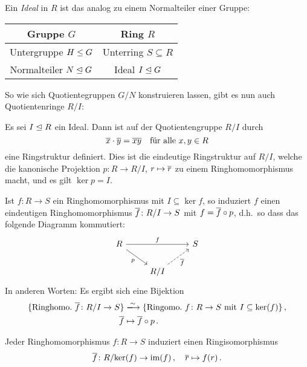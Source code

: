 Ein \emph{Ideal} in $R$ ist das analog zu einem Normalteiler einer Gruppe:
\begin{center}
  \begin{tabular}{|c|c|}
    \hline
      Gruppe $G$
    & Ring $R$
    \\
    \hline
      Untergruppe $H \mathrel{\leq} G$
    & Unterring $S \subseteq R$
    \\
    \hline
      Normalteiler $N \mathrel{\trianglelefteq} G$
    & Ideal $I \mathrel{\trianglelefteq} G$
    \\
    \hline
  \end{tabular}
\end{center}
So wie sich Quotientegruppen $G/N$ konstruieren lassen, gibt es nun auch Quotientenringe $R/I$:

Es sei $I \mathrel{\trianglelefteq} R$ ein Ideal.
Dann ist auf der Quotientengruppe $R/I$ durch
\[
    \overline{x} \cdot \overline{y}
  = \overline{xy}
  \quad
  \text{für alle $x, y \in R$}
\]
eine Ringstruktur definiert.
Dies ist die eindeutige Ringstruktur auf $R/I$, welche die kanonische Projektion $p \colon R \to R/I$, $r \mapsto \overline{r}$ zu einem Ringhomomorphismus macht, und es gilt $\ker p = I$.

\begin{theorem}
  Ist $f \colon R \to S$ ein Ringhomomorphismus mit $I \subseteq \ker f$, so induziert $f$ einen eindeutigen Ringhomomorphismus $\overline{f} \colon R/I \to S$ mit $f = \overline{f} \circ p$, d.h.\ so dass das folgende Diagramm kommutiert:
  \[
    \begin{tikzcd}
        R
        \arrow{rr}[above]{f}
        \arrow{dr}[below left]{p}
      & {}
      & S
      \\
        {}
      & R/I
        \arrow[dashed]{ru}[below right]{\induced{f}}
      & {}
    \end{tikzcd}
  \]
  In anderen Worten:
  Es ergibt sich eine Bijektion
  \begin{align*}
                            \{ \text{Ringhomo.\ $\induced{f} \colon R/I \to S$} \}
    &\xlongrightarrow{\sim} \{ \text{Ringomo.\ $f \colon R \to S$ mit $I \subseteq \ker(f)$} \} \,,  \\
                            \induced{f}
    &\mapsto                \induced{f} \circ p \,.
  \end{align*}
\end{theorem}

\begin{corollary}[1.\ Isomorphiesatz]
  Jeder Ringhomomorphismus $f \colon R \to S$ induziert einen Ringisomorphismus
  \[
            \overline{f}
    \colon  R/{\ker(f)}
    \to     \operatorname{im}(f) \,,
    \quad   \overline{r}
    \mapsto f(r) \,.
  \]
\end{corollary}

